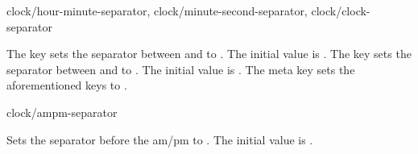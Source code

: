 \documentclass{beery}
\begin{document}
\begin{variable}
  {
    clock/hour-minute-separator,
    clock/minute-second-separator,
    clock/clock-separator
  }
  \begin{syntax}
  \end{syntax}
  The key  sets the separator between  and  to .
  The initial value is \key{=:}.
  The key  sets the separator between  and  to .
  The initial value is \key{=:}.
  The meta key  sets the aforementioned keys to .
\end{variable}



\begin{variable}{clock/ampm-separator}
  \begin{syntax}
  \end{syntax}
  Sets the separator before the am/pm to .
  The initial value is \key{=\textvisiblespace}.
\end{variable}
\end{document}
